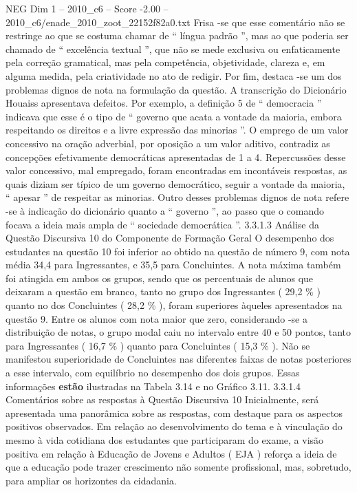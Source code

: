 \begin{textsample}{NEG Dim 1 – 2010\_c6 – Score -2.00 – 2010\_c6/enade\_2010\_zoot\_22152f82a0.txt}
Frisa -se que esse comentário não se restringe ao que se costuma chamar de “ língua padrão ”, mas ao que poderia ser chamado de “ excelência textual ”, que não se mede exclusiva ou enfaticamente pela correção gramatical, mas pela competência, objetividade, clareza e, em alguma medida, pela criatividade no ato de redigir.
Por fim, destaca -se um dos problemas dignos de nota na formulação da questão.
A transcrição do Dicionário Houaiss apresentava defeitos.
Por exemplo, a definição 5 de “ democracia ” indicava que esse é o tipo de “ governo que acata a vontade da maioria, embora respeitando os direitos e a livre expressão das minorias ”.
O emprego de um valor concessivo na oração adverbial, por oposição a um valor aditivo, contradiz as concepções efetivamente democráticas apresentadas de 1 a 4.
Repercussões desse valor concessivo, mal empregado, foram encontradas em incontáveis respostas, as quais diziam ser típico de um governo democrático, seguir a vontade da maioria, “ apesar ” de respeitar as minorias.
Outro desses problemas dignos de nota refere -se à indicação do dicionário quanto a “ governo ”, ao passo que o comando focava a ideia mais ampla de “ sociedade democrática ”. 3.3.1.3 Análise da Questão Discursiva 10 do Componente de Formação Geral O desempenho dos estudantes na questão 10 foi inferior ao obtido na questão de número 9, com nota média 34,4 para Ingressantes, e 35,5 para Concluintes.
A nota máxima também foi atingida em ambos os grupos, sendo que os percentuais de alunos que deixaram a questão em branco, tanto no grupo dos Ingressantes ( 29,2 \% ) quanto no dos Concluintes ( 28,2 \% ), foram superiores àqueles apresentados na questão 9.
Entre os alunos com nota maior que zero, considerando -se a distribuição de notas, o grupo modal caiu no intervalo entre 40 e 50 pontos, tanto para Ingressantes ( 16,7 \% ) quanto para Concluintes ( 15,3 \% ).
Não se manifestou superioridade de Concluintes nas diferentes faixas de notas posteriores a esse intervalo, com equilíbrio no desempenho dos dois grupos.
Essas informações \textbf{estão} ilustradas na Tabela 3.14 e no Gráfico 3.11. 3.3.1.4 Comentários sobre as respostas à Questão Discursiva 10 Inicialmente, será apresentada uma panorâmica sobre as respostas, com destaque para os aspectos positivos observados.
Em relação ao desenvolvimento do tema e à vinculação do mesmo à vida cotidiana dos estudantes que participaram do exame, a visão positiva em relação à Educação de Jovens e Adultos ( EJA ) reforça a ideia de que a educação pode trazer crescimento não somente profissional, mas, sobretudo, para ampliar os horizontes da cidadania.

\end{textsample}
